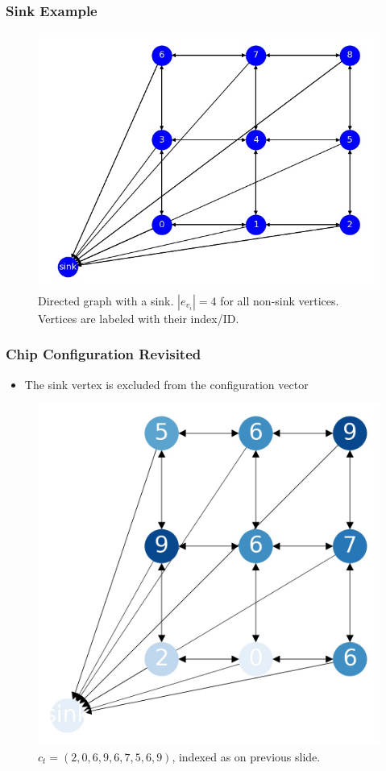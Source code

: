\documentclass{beamer}
\begin{document}
\begin{frame}
\frametitle{Sink Example}


  \begin{figure}[h!]
    \centering
      \includegraphics[scale=0.45]{sandpile_base}
      \caption{Directed graph with a sink.  $|e_{v_i}| = 4$ for all non-sink vertices.
      Vertices are labeled with their index/ID.}
  \end{figure}
\end{frame}

\begin{frame}
\frametitle{Chip Configuration Revisited}
  \begin{itemize}
    \item The sink vertex is excluded from the configuration vector
  \end{itemize}

  \begin{figure}[h!]
    \centering
      \includegraphics[scale=0.25]{sandpile_rand_state_0}
      \caption{$c_t = (2,0,6,9,6,7,5,6,9)$, indexed as on previous slide.}
  \end{figure}
\end{frame}
\end{document}
